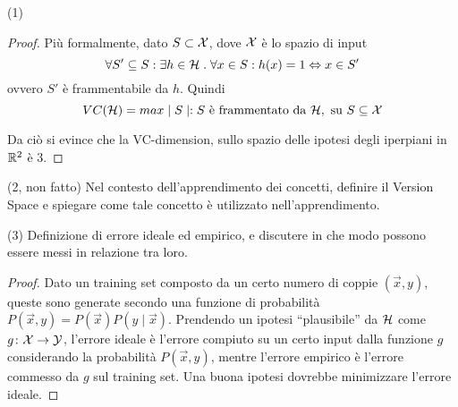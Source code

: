 \documentclass[12pt,a4paper,oneside]{book}
\begin{document}
\begin{exercise}{(1)}
\begin{proof}
        Più formalmente, dato $S \subset \mathcal{X}$, dove $\mathcal{X}$ è lo
        spazio di input
        \[
            \forall S' \subseteq S \mathrel{:} \exists h \in \mathcal{H} \mathrel{.} \forall x \in S \mathrel{:} h(x) = 1 \Leftrightarrow x \in S'
        \] 
        ovvero $S'$ è frammentabile da $h$.
        Quindi
        \[
            VC(\mathcal{H}) = max \mid S \mid \mathrel{:} S\text{ è frammentato da }\mathcal{H},\text{ su }S \subseteq \mathcal{X}
        \]
        
        Da ciò si evince che la VC-dimension, sullo spazio delle
        ipotesi degli iperpiani in $\mathbb{R}^2$ è 3.
    \end{proof}
\end{exercise}

\begin{exercise}{(2, non fatto)}
	Nel contesto dell'apprendimento dei concetti, definire il Version Space e spiegare come tale concetto è utilizzato nell'apprendimento.
\end{exercise}

\begin{exercise}(3)
    Definizione di errore ideale ed empirico, e discutere in che modo
    possono essere messi in relazione tra loro.
    
    \begin{proof}
        Dato un training set composto da un certo numero di coppie
        $(\vec{x},y)$, queste sono generate secondo una funzione di
        probabilità $P(\vec{x},y) =
        P(\vec{x})P(y\mid\vec{x})$. Prendendo un ipotesi
        ``plausibile'' da $\mathcal{H}$ come $\mathord{g}\colon\mathcal{X}\to\mathcal{Y}$,
        l'errore ideale è l'errore compiuto su un certo input dalla
        funzione $g$ considerando la probabilità $P(\vec{x},y)$,
        mentre l'errore empirico è l'errore commesso da $g$ sul
        training set. Una buona ipotesi dovrebbe minimizzare l'errore
        ideale.
    \end{proof}
\end{exercise}
\end{document}
